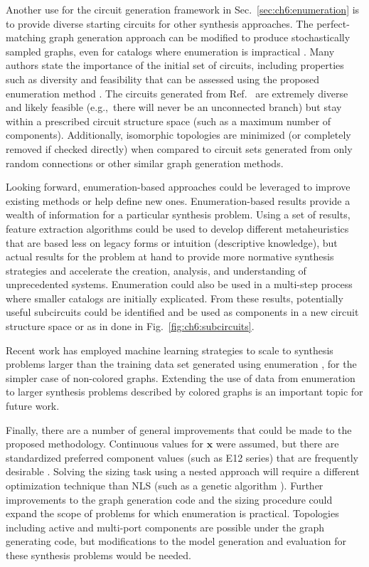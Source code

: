 Another use for the circuit generation framework in Sec.~\ref{sec:ch6:enumeration} is to provide diverse starting circuits for other synthesis approaches.
The perfect-matching graph generation approach can be modified to produce stochastically sampled graphs, even for catalogs where enumeration is impractical \cite{Herber2017a}.
Many authors state the importance of the initial set of circuits, including properties such as diversity and feasibility that can be assessed using the proposed enumeration method \cite{Das2007a, Gan2010a}.
The circuits generated from Ref.~\cite{github-pm-architectures-project} are extremely diverse and likely feasible (e.g.,~there will never be an unconnected branch) but stay within a prescribed circuit structure space (such as a maximum number of components).
Additionally, isomorphic topologies are minimized (or completely removed if checked directly) when compared to circuit sets generated from only random connections or other similar graph generation methods. 

Looking forward, enumeration-based approaches could be leveraged to improve existing methods or help define new ones. 
Enumeration-based results provide a wealth of information for a particular synthesis problem.
Using a set of results, feature extraction algorithms could be used to develop different metaheuristics that are based less on legacy forms or intuition (descriptive knowledge), but actual results for the problem at hand \cite{Berlingerio2009a} to provide more normative synthesis strategies and accelerate the creation, analysis, and understanding of unprecedented systems.
Enumeration could also be used in a multi-step process where smaller catalogs are initially explicated. From these results, potentially useful subcircuits could be identified and be used as components in a new circuit structure space or as in done in Fig.~\ref{fig:ch6:subcircuits}.

Recent work has employed machine learning strategies to scale to synthesis problems larger than the training data set generated using enumeration \cite{GuoScitech2018}, for the simpler case of non-colored graphs.
Extending the use of data from enumeration to larger synthesis problems described by colored graphs is an important topic for future work.

Finally, there are a number of general improvements that could be made to the proposed methodology.
Continuous values for $\bm{x}$ were assumed, but there are standardized preferred component values (such as E12 series) that are frequently desirable \cite{Gan2010a}.
Solving the sizing task using a nested approach will require a different optimization technique than NLS (such as a genetic algorithm \cite{Goh2001a}).
Further improvements to the graph generation code and the sizing procedure could expand the scope of problems for which enumeration is practical.
Topologies including active and multi-port components are possible under the graph generating code, but modifications to the model generation and evaluation for these synthesis problems would be needed.